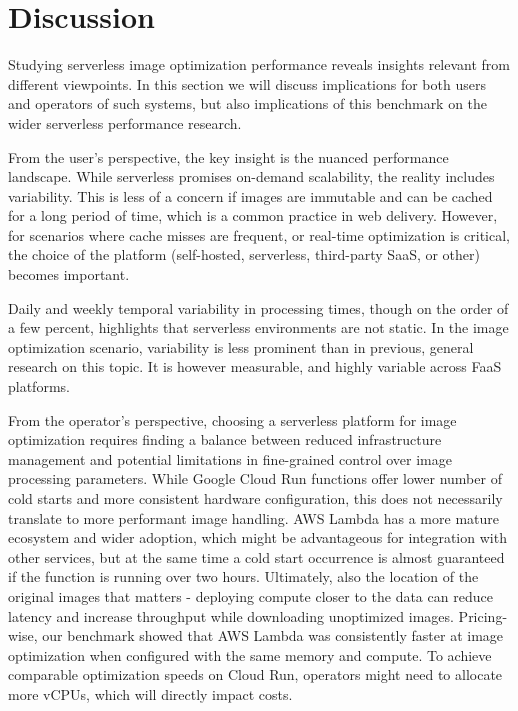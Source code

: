 \clearpage
\section{Discussion}
\label{cha:discussion}

Studying serverless image optimization performance reveals insights relevant from different viewpoints. In this section we will discuss implications for both users and operators of such systems, but also implications of this benchmark on the wider serverless performance research.

From the user's perspective, the key insight is the nuanced performance landscape. While serverless promises on-demand scalability, the reality includes variability. This is less of a concern if images are immutable and can be cached for a long period of time, which is a common practice in web delivery. However, for scenarios where cache misses are frequent, or real-time optimization is critical, the choice of the platform (self-hosted, serverless, third-party SaaS, or other) becomes important.

Daily and weekly temporal variability in processing times, though on the order of a few percent, highlights that serverless environments are not static. In the image optimization scenario, variability is less prominent than in previous, general research on this topic. It is however measurable, and highly variable across FaaS platforms. 

From the operator's perspective, choosing a serverless platform for image optimization requires finding a balance between reduced infrastructure management and potential limitations in fine-grained control over image processing parameters. While Google Cloud Run functions offer lower number of cold starts and more consistent hardware configuration, this does not necessarily translate to more performant image handling. AWS Lambda has a more mature ecosystem and wider adoption, which might be advantageous for integration with other services, but at the same time a cold start occurrence is almost guaranteed if the function is running over two hours. Ultimately, also the location of the original images that matters - deploying compute closer to the data can reduce latency and increase throughput while downloading unoptimized images. Pricing-wise, our benchmark showed that AWS Lambda was consistently faster at image optimization when configured with the same memory and compute. To achieve comparable optimization speeds on Cloud Run, operators might need to allocate more vCPUs, which will directly impact costs.


